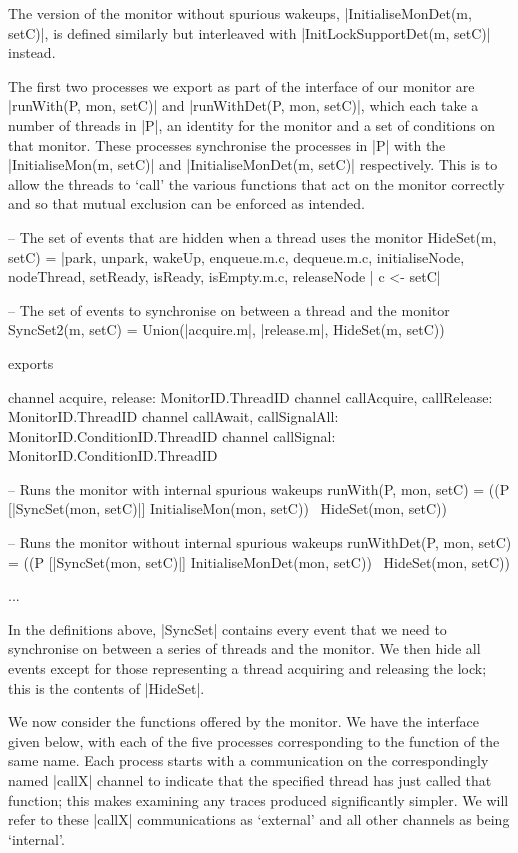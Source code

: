 The version of the monitor without spurious wakeups, |InitialiseMonDet(m, setC)|, is defined similarly but interleaved with |InitLockSupportDet(m, setC)| instead. 

The first two processes we export as part of the interface of our monitor are |runWith(P, mon, setC)| and |runWithDet(P, mon, setC)|, which each take a number of threads in |P|, an identity for the monitor and a set of conditions on that monitor. These processes synchronise the processes in |P| with the |InitialiseMon(m, setC)| and |InitialiseMonDet(m, setC)| respectively. This is to allow the threads to `call' the various functions that act on the monitor correctly and so that mutual exclusion can be enforced as intended.

\begin{cspm}
  -- The set of events that are hidden when a thread uses the monitor
  HideSet(m, setC) = 
    {|park, unpark, wakeUp, enqueue.m.c, dequeue.m.c, initialiseNode, nodeThread,
      setReady, isReady, isEmpty.m.c, releaseNode | c <- setC|}

  -- The set of events to synchronise on between a thread and the monitor
    SyncSet2(m, setC) = Union({{|acquire.m|}, {|release.m|}, HideSet(m, setC)})
  
  exports

  channel acquire, release: MonitorID.ThreadID
  channel callAcquire, callRelease: MonitorID.ThreadID
  channel callAwait, callSignalAll: MonitorID.ConditionID.ThreadID
  channel callSignal: MonitorID.ConditionID.ThreadID

  -- Runs the monitor with internal spurious wakeups
  runWith(P, mon, setC) = 
    ((P [|SyncSet(mon, setC)|] 
          InitialiseMon(mon, setC)) \ HideSet(mon, setC))

  -- Runs the monitor without internal spurious wakeups
  runWithDet(P, mon, setC) = 
    ((P [|SyncSet(mon, setC)|] 
          InitialiseMonDet(mon, setC)) \  HideSet(mon, setC))

  ...
\end{cspm}

In the definitions above, |SyncSet| contains every event that we need to synchronise on between a series of threads and the monitor. We then hide all events except for those representing a thread acquiring and releasing the lock; this is the contents of |HideSet|.

We now consider the functions offered by the monitor. We have the interface given below, with each of the five processes corresponding to the function of the same name. Each process starts with a communication on the correspondingly named |callX| channel to indicate that the specified thread has just called that function; this makes examining any traces produced significantly simpler. We will refer to these |callX| communications as `external' and all other channels as being `internal'. 
  
